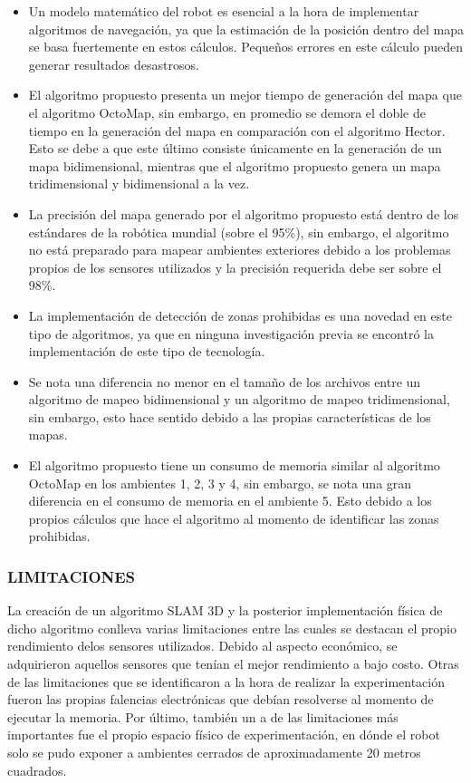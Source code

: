 \begin{itemize}
    \item Un modelo matemático del robot es esencial a la hora de implementar algoritmos de navegación, ya que la estimación de la posición dentro del mapa se basa fuertemente en estos cálculos. Pequeños errores en este cálculo pueden generar resultados desastrosos.
    \item El algoritmo propuesto presenta un mejor tiempo de generación del mapa que el algoritmo OctoMap, sin embargo, en promedio se demora el doble de tiempo en la generación del mapa en comparación con el algoritmo Hector. Esto se debe a que este último consiste únicamente en la generación de un mapa bidimensional, mientras que el algoritmo propuesto genera un mapa tridimensional y bidimensional a la vez.
    \item La precisión del mapa generado por el algoritmo propuesto está dentro de los estándares de la robótica mundial (sobre el 95\%), sin embargo, el algoritmo no está preparado para mapear ambientes exteriores debido a los problemas propios de los sensores utilizados y la precisión requerida debe ser sobre el 98\%.
    \item La implementación de detección de zonas prohibidas es una novedad en este tipo de algoritmos, ya que en ninguna investigación previa se encontró la implementación de este tipo de tecnología. 
    \item Se nota una diferencia no menor en el tamaño de los archivos entre un algoritmo de mapeo bidimensional y un algoritmo de mapeo tridimensional, sin embargo, esto hace sentido debido a las propias características de los mapas.
    \item El algoritmo propuesto tiene un consumo de memoria similar al algoritmo OctoMap en los ambientes 1, 2, 3 y 4, sin embargo, se nota una gran diferencia en el consumo de memoria en el ambiente 5. Esto debido a los propios cálculos que hace el algoritmo al momento de identificar las zonas prohibidas.
\end{itemize}

\subsubsection{LIMITACIONES}
La creación de un algoritmo SLAM 3D y la posterior implementación física de dicho algoritmo conlleva varias limitaciones entre las cuales se destacan el propio rendimiento delos sensores utilizados. Debido al aspecto económico, se adquirieron aquellos sensores que tenían el mejor rendimiento a bajo costo. Otras de las limitaciones que se identificaron a la hora de realizar la experimentación fueron las propias falencias electrónicas que debían resolverse al momento de ejecutar la memoria. Por último, también un a de las limitaciones más importantes fue el propio espacio físico de experimentación, en dónde el robot solo se pudo exponer a ambientes cerrados de aproximadamente 20 metros cuadrados.

